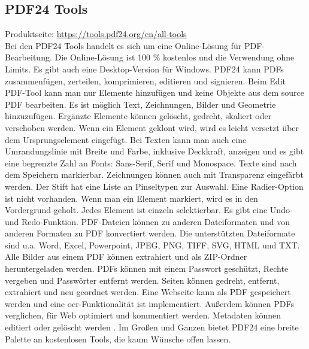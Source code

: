 \subsection{PDF24 Tools}
Produktseite: \url{https://tools.pdf24.org/en/all-tools} \\
Bei den PDF24 Tools handelt es sich um eine Online-Lösung für PDF-Bearbeitung. Die Online-Lösung ist 100 \% kostenlos und die Verwendung ohne Limits. Es gibt auch eine Desktop-Version für Windows. PDF24 kann PDFs zusammenfügen, zerteilen, komprimieren, editieren und signieren. Beim Edit PDF-Tool kann man nur Elemente hinzufügen und keine Objekte aus dem source PDF bearbeiten. Es ist möglich Text, Zeichnungen, Bilder und Geometrie hinzuzufügen. Ergänzte Elemente können gelöscht, gedreht, skaliert oder verschoben werden. Wenn ein Element geklont wird, wird es leicht versetzt über dem Ursprungselement eingefügt. Bei Texten kann man auch eine Umrandungslinie mit Breite und Farbe, inklusive Deckkraft, anzeigen und es gibt eine begrenzte Zahl an Fonts: Sans-Serif, Serif und Monospace. Texte sind nach dem Speichern markierbar. Zeichnungen können auch mit Transparenz eingefärbt werden. Der Stift hat eine Liste an Pinseltypen zur Auswahl. Eine Radier-Option ist nicht vorhanden. Wenn man ein Element markiert, wird es in den Vordergrund geholt. Jedes Element ist einzeln selektierbar. Es gibt eine Undo- und Redo-Funktion. PDF-Dateien können zu anderen Dateiformaten und von anderen Formaten zu PDF konvertiert werden. Die unterstützten Dateiformate sind u.a. Word, Excel, Powerpoint, JPEG, PNG, TIFF, SVG, HTML und TXT. Alle Bilder aus einem PDF können extrahiert und als ZIP-Ordner heruntergeladen werden. PDFs können mit einem Passwort geschützt, Rechte vergeben und Passwörter entfernt werden. Seiten können gedreht, entfernt, extrahiert und neu geordnet werden. Eine Webseite kann als PDF gespeichert werden und eine \gls{ocr}-Funktionalität ist implementiert. Außerdem können PDFs verglichen, für Web optimiert und kommentiert werden. Metadaten können editiert oder gelöscht werden \cite{pdf24}. Im Großen und Ganzen bietet PDF24 eine breite Palette an kostenlosen Tools, die kaum Wünsche offen lassen.

